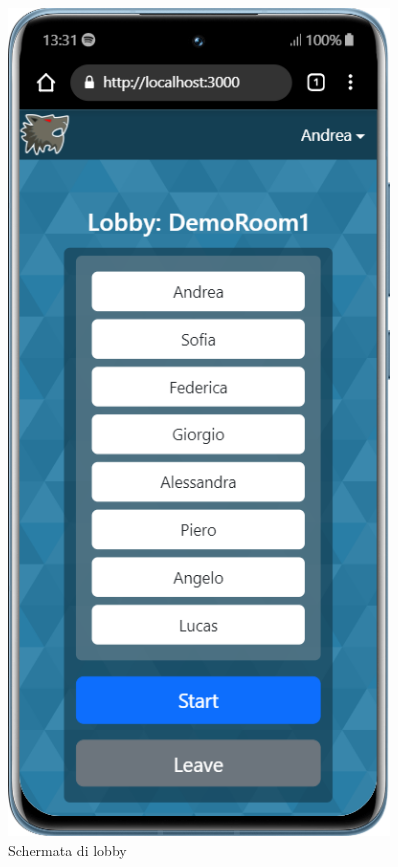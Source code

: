 \begin{figure}[H]
    \centering
    \begin{minipage}{0.45\textwidth}
        \centering
        \includegraphics[width=0.9\textwidth]{img/screen/mobile/lobby_mobile.png}
        \caption{Schermata di lobby}
        \label{fig:lobby_mobile}

\end{minipage}
\end{figure}
